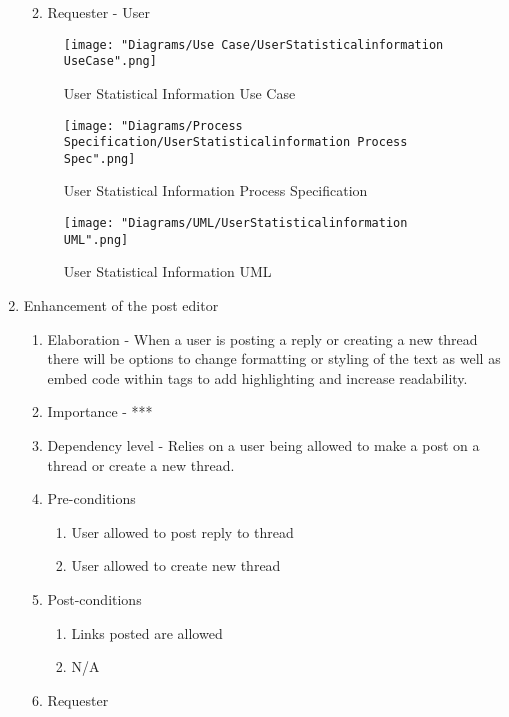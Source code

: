 \documentclass[12pt]{article}
\begin{document}
\begin{enumerate}
\begin{enumerate}
\begin{enumerate}
    \end{enumerate}
    \item Requester - User
  \end{enumerate}
  \begin{figure}[h]
  	\centering
  	\texttt{[image: "Diagrams/Use Case/UserStatisticalinformation UseCase".png]}
  	\caption{User Statistical Information Use Case}
  \end{figure}
  \begin{figure}[h]
  	\centering
  	\texttt{[image: "Diagrams/Process Specification/UserStatisticalinformation Process Spec".png]}
  	\caption{User Statistical Information Process Specification}
  \end{figure}
     \begin{figure}[h]
     	\centering
     	\texttt{[image: "Diagrams/UML/UserStatisticalinformation UML".png]}
     	\caption{User Statistical Information UML}
     \end{figure}
\clearpage %
   \item Enhancement of the post editor %
  \begin{enumerate}
    \item Elaboration - When a user is posting a reply or creating a new thread there will be options to change formatting or styling of the text as well as embed code within tags to add highlighting and increase readability.
    \item Importance - ***
    \item Dependency level - Relies on a user being allowed to make a post on a thread or create a new thread.
    \item Pre-conditions
    \begin{enumerate}
    	\item User allowed to post reply to thread
    	\item User allowed to create new thread
    \end{enumerate}
        \item Post-conditions
    \begin{enumerate}
    	\item Links posted are allowed
    	\item N/A
    \end{enumerate}
    \item Requester
  \end{enumerate}

\end{enumerate}
\end{document}
